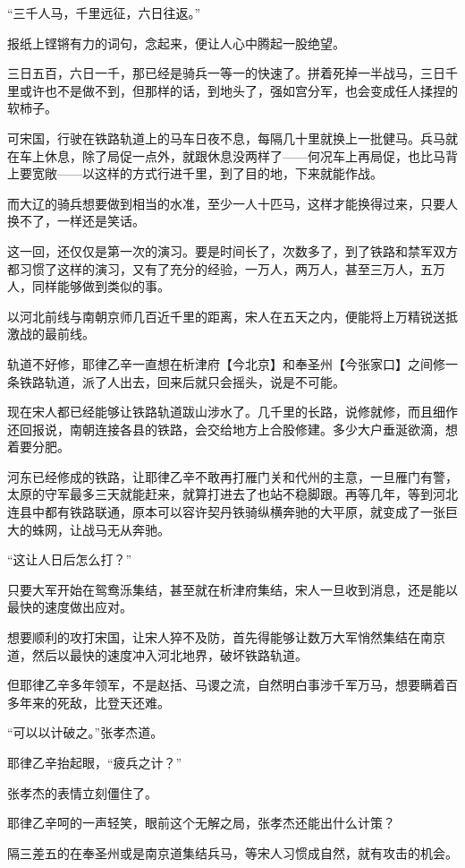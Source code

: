 “三千人马，千里远征，六日往返。”

报纸上铿锵有力的词句，念起来，便让人心中腾起一股绝望。

三日五百，六日一千，那已经是骑兵一等一的快速了。拼着死掉一半战马，三日千里或许也不是做不到，但那样的话，到地头了，强如宫分军，也会变成任人揉捏的软柿子。

可宋国，行驶在铁路轨道上的马车日夜不息，每隔几十里就换上一批健马。兵马就在车上休息，除了局促一点外，就跟休息没两样了——何况车上再局促，也比马背上要宽敞——以这样的方式行进千里，到了目的地，下来就能作战。

而大辽的骑兵想要做到相当的水准，至少一人十匹马，这样才能换得过来，只要人换不了，一样还是笑话。

这一回，还仅仅是第一次的演习。要是时间长了，次数多了，到了铁路和禁军双方都习惯了这样的演习，又有了充分的经验，一万人，两万人，甚至三万人，五万人，同样能够做到类似的事。

以河北前线与南朝京师几百近千里的距离，宋人在五天之内，便能将上万精锐送抵激战的最前线。

轨道不好修，耶律乙辛一直想在析津府【今北京】和奉圣州【今张家口】之间修一条铁路轨道，派了人出去，回来后就只会摇头，说是不可能。

现在宋人都已经能够让铁路轨道跋山涉水了。几千里的长路，说修就修，而且细作还回报说，南朝连接各县的铁路，会交给地方上合股修建。多少大户垂涎欲滴，想着要分肥。

河东已经修成的铁路，让耶律乙辛不敢再打雁门关和代州的主意，一旦雁门有警，太原的守军最多三天就能赶来，就算打进去了也站不稳脚跟。再等几年，等到河北连县中都有铁路联通，原本可以容许契丹铁骑纵横奔驰的大平原，就变成了一张巨大的蛛网，让战马无从奔驰。

“这让人日后怎么打？”

只要大军开始在鸳鸯泺集结，甚至就在析津府集结，宋人一旦收到消息，还是能以最快的速度做出应对。

想要顺利的攻打宋国，让宋人猝不及防，首先得能够让数万大军悄然集结在南京道，然后以最快的速度冲入河北地界，破坏铁路轨道。

但耶律乙辛多年领军，不是赵括、马谡之流，自然明白事涉千军万马，想要瞒着百多年来的死敌，比登天还难。

“可以以计破之。”张孝杰道。

耶律乙辛抬起眼，“疲兵之计？”

张孝杰的表情立刻僵住了。

耶律乙辛呵的一声轻笑，眼前这个无解之局，张孝杰还能出什么计策？

隔三差五的在奉圣州或是南京道集结兵马，等宋人习惯成自然，就有攻击的机会。

